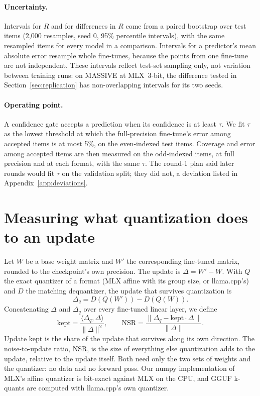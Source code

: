 \documentclass[11pt,letterpaper]{article}
\begin{document}
\paragraph{Uncertainty.} Intervals for $R$ and for differences in $R$ come from a paired bootstrap over test items (2,000 resamples, seed 0, 95\% percentile intervals), with the same resampled items for every model in a comparison. Intervals for a predictor's mean absolute error resample whole fine-tunes, because the points from one fine-tune are not independent. These intervals reflect test-set sampling only, not variation between training runs: on MASSIVE at MLX~3-bit, the difference tested in Section~\ref{sec:replication} has non-overlapping intervals for its two seeds.

\paragraph{Operating point.} A confidence gate accepts a prediction when its confidence is at least $\tau$. We fit $\tau$ as the lowest threshold at which the full-precision fine-tune's error among accepted items is at most 5\%, on the even-indexed test items. Coverage and error among accepted items are then measured on the odd-indexed items, at full precision and at each format, with the same $\tau$. The round-1 plan said later rounds would fit $\tau$ on the validation split; they did not, a deviation listed in Appendix~\ref{app:deviations}.

\section{Measuring what quantization does to an update}
\label{sec:mechanism}

Let $W$ be a base weight matrix and $W'$ the corresponding fine-tuned matrix, rounded to the checkpoint's own precision. The update is $\Delta = W' - W$. With $Q$ the exact quantizer of a format (MLX affine with its group size, or llama.cpp's) and $D$ the matching dequantizer, the update that survives quantization is
\begin{equation}
\Delta_q = D(Q(W')) - D(Q(W)).
\end{equation}
Concatenating $\Delta$ and $\Delta_q$ over every fine-tuned linear layer, we define
\begin{equation}
\mathrm{kept} = \frac{\langle \Delta_q, \Delta \rangle}{\lVert \Delta \rVert^2},
\qquad
\mathrm{NSR} = \frac{\lVert \Delta_q - \mathrm{kept}\cdot\Delta \rVert}{\lVert \Delta \rVert}.
\end{equation}
Update kept is the share of the update that survives along its own direction. The noise-to-update ratio, NSR, is the size of everything else quantization adds to the update, relative to the update itself. Both need only the two sets of weights and the quantizer: no data and no forward pass. Our numpy implementation of MLX's affine quantizer is bit-exact against MLX on the CPU, and GGUF k-quants are computed with llama.cpp's own quantizer.
\end{document}
